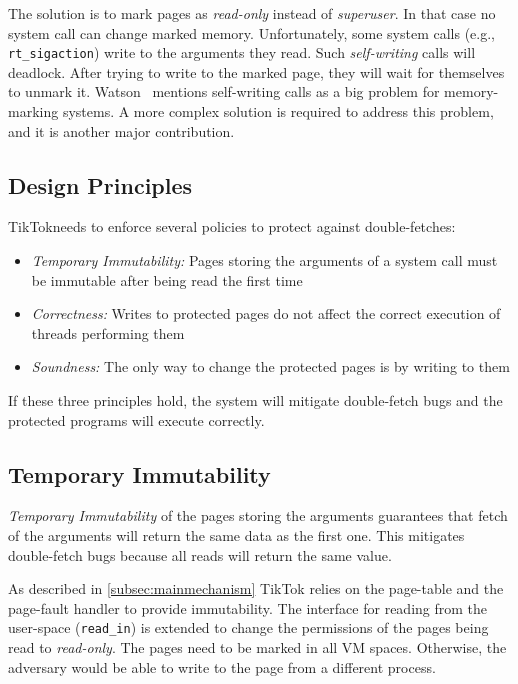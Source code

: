 \documentclass[conference]{IEEEtran}
\newcommand{\mat}[1]{\textcolor{red}{\textbf{Mat:} #1}}
\newcommand{\sysname}{TikTok}
\begin{document}
The solution is to mark pages as \emph{read-only} instead of \emph{superuser}.
In that case no system call can change marked memory. Unfortunately, some system
calls (e.g., \texttt{rt\_sigaction}) write to the arguments they read. Such
\emph{self-writing} calls will deadlock. After trying to write to the marked
page, they will wait for themselves to unmark it.
Watson~\cite{watson2007exploiting} mentions self-writing calls as a big problem
for memory-marking systems. A more complex solution is required to address this
problem, and it is another major contribution.

\subsection{Design Principles}
\label{subsec:designprinciples}
\sysname needs to enforce several policies to protect against double-fetches:

\begin{itemize}
  \item \label{policy:immutability} \emph{Temporary Immutability:} Pages storing
  the arguments of a system call must be immutable after being read the first
  time
  \item \label{policy:correctness} \emph{Correctness:} Writes to protected pages
  do not affect the correct execution of threads performing them
  \item \label{policy:soundness} \emph{Soundness:} The only way to change the
  protected pages is by writing to them
\end{itemize}

If these three principles hold, the system will mitigate double-fetch bugs and
the protected programs will execute correctly.

\subsection{Temporary Immutability}
\label{subsec:tempimmut}
\emph{Temporary Immutability} of the pages storing the arguments guarantees that
fetch of the arguments will return the same data as the first one. This mitigates
double-fetch bugs because all reads will return the same value.

As described in \autoref{subsec:mainmechanism} \sysname{} relies on the
page-table and the page-fault handler to provide immutability. The interface for
reading from the user-space (\texttt{read\_in}) is extended to change the
permissions of the pages being read to \emph{read-only}. The pages need to be
marked in all VM spaces. Otherwise, the adversary would be able to write to the
page from a different process.
\end{document}
